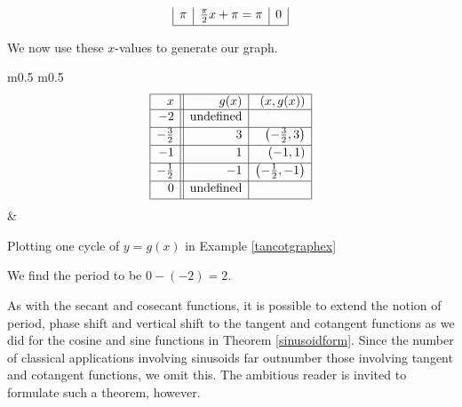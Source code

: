{\begin{enumerate}
{\[\begin{array}{|r|r|r|}
\pi  & \frac{\pi}{2} x + \pi = \pi   &  0 \\  [2pt] \hline
\end{array} \]
\setlength{\extrarowheight}{0pt}}

We now use these $x$-values to generate our graph.

\medskip

\noindent\hskip-30pt\begin{minipage}{\textwidth}
\begin{center}
\begin{tabular}{ m{} m{}}
\setlength{\extrarowheight}{2pt}
\[ \begin{array}{|r||r|r|}  

\hline

 x & g(x) & (x,g(x))  \\ \hline
-2  & \text{undefined} &   \\ [2pt]   \hline
-\frac{3}{2}  &  3 &  \left(-\frac{3}{2}, 3 \right) \\ [2pt] \hline 
-1 & 1 &  (-1,1)  \\ [2pt] \hline 
-\frac{1}{2}  & -1 &  \left(-\frac{1}{2}, -1 \right) \\ [2pt] \hline 
0 & \text{undefined} &  \\ [2pt] \hline 
\end{array} \]  \setlength{\extrarowheight}{0pt} & 

\end{tabular}
\end{center}
\captionsetup{type=figure}
\caption{Plotting one cycle of $y=g(x)$ in Example \ref{tancotgraphex}}
\end{minipage}

\medskip


We find the period to be $0 - (-2) = 2$. 

\end{enumerate}
}

\medskip

As with the secant and cosecant functions, it is possible to extend the notion of period, phase shift and vertical shift to the tangent and cotangent functions as we did for the cosine and sine functions in Theorem \ref{sinusoidform}.  Since the number of classical applications involving sinusoids far outnumber those involving tangent and cotangent functions, we omit this.  The ambitious reader is invited to formulate such a theorem, however.


